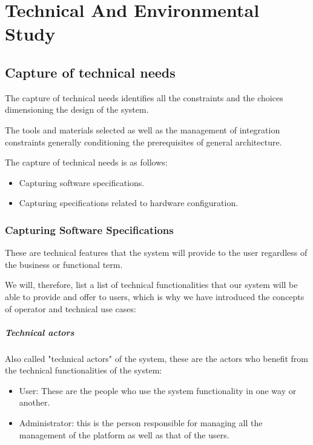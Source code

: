 

\setcounter{mtc}{11}

\chapter{Technical And Environmental Study}%
\label{chap:chapter_tree}
\minitoc
\section{Capture of technical needs}
The capture of technical needs identifies all the constraints and the choices dimensioning the design of the system.

The tools and materials selected as well as the management of integration constraints generally conditioning the prerequisites of general architecture.

The capture of technical needs is as follows:
\begin{itemize}\addtolength{\itemsep}{-0.35\baselineskip}
      \item
            Capturing software specifications.

      \item
            Capturing specifications related to hardware configuration.

\end{itemize}

\subsection{Capturing Software Specifications}
These are technical features that the system will provide to the user regardless of the business or functional term.

We will, therefore, list a list of technical functionalities that our system will be able to provide and offer to users, which is why we have introduced the concepts of operator and technical use cases:

\paragraph{Technical actors}
Also called "technical actors" of the system, these are the actors who benefit from the technical functionalities of the system:
\begin{itemize}\addtolength{\itemsep}{-0.35\baselineskip}
      \item
            User: These are the people who use the system functionality in one way or another.
      \item
            Administrator: this is the person responsible for managing all the management of the platform as well as that of the users.
\end{itemize}

